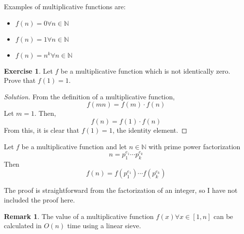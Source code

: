 \documentclass[12pt,letterpaper]{book}
\theoremstyle{definition}
\newtheorem*{remark}{Remark}
\newtheorem*{exercise}{Exercise}
\newenvironment{solution}
  {\renewcommand\qedsymbol{$\blacksquare$}\begin{proof}[Solution]}
  {\end{proof}}
\newcommand{\N}{\mathbb{N}}
\begin{document}
Examples of multiplicative functions are:
\begin{itemize}
  \item $f(n) = 0 \forall n \in \N$
  \item $f(n) = 1 \forall n \in \N$
  \item $f(n) = n^k \forall n \in \N$
\end{itemize}

\begin{exercise}
  Let $f$ be a multiplicative function which is not identically zero. Prove that $f(1) = 1$.
\end{exercise}
\begin{solution}
 From the definition of a multiplicative function,
 \[f(mn) = f(m) \cdot f(n)\]
 Let $m = 1$. Then,
 \[f(n) = f(1) \cdot f(n)\]
 From this, it is clear that $f(1) = 1$, the identity element.
\end{solution}

\begin{theorem}
  Let $f$ be a multiplicative function and let $n \in \N$ with prime power factorization
  \[n = p_1^{e_1} \cdots p_k^{e_k}\]
  Then
  \[f(n) = f(p_1^{e_1}) \cdots f(p_k^{e_k})\]
\end{theorem}

The proof is straightforward from the factorization of an integer, so I have not included the proof here.

\begin{remark}
  The value of a multiplicative function $f(x) \forall x \in [1,n]$ can be calculated in $O(n)$ time using a linear sieve. 
\end{remark}
\end{document}
